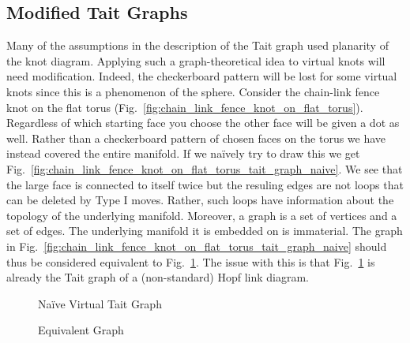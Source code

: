     \subsection{Modified Tait Graphs}
        Many of the assumptions in the description of the Tait graph used
        planarity of the knot diagram. Applying such a graph-theoretical
        idea to virtual knots will need modification. Indeed, the checkerboard
        pattern will be lost for some virtual knots since this is a
        phenomenon of the sphere. Consider the chain-link fence knot on the
        flat torus (Fig.~\ref{fig:chain_link_fence_knot_on_flat_torus}).
        Regardless of which starting face you choose the other face will be
        given a dot as well. Rather than a checkerboard pattern of chosen
        faces on the torus we have instead covered the entire manifold. If we
        na\"{i}vely try to draw this we get
        Fig.~\ref{fig:chain_link_fence_knot_on_flat_torus_tait_graph_naive}. We
        see that the large face is connected to itself twice but the
        resuling edges are not loops that can be deleted by Type I moves.
        Rather, such loops  have information about the topology of the
        underlying manifold. Moreover, a graph is a set of vertices and a set
        of edges. The underlying manifold it is embedded on is immaterial.
        The graph in
        Fig.~\ref{fig:chain_link_fence_knot_on_flat_torus_tait_graph_naive}
        should thus be considered equivalent to
        Fig.~\ref{fig:chain_link_fence_knot_naive_tait_graph}. The issue with
        this is that
        Fig.~\ref{fig:chain_link_fence_knot_naive_tait_graph} is already the
        Tait graph of a (non-standard) Hopf link diagram.
        \begin{figure}
            \centering
            \begin{minipage}[b]{0.49\textwidth}
                \centering
                \caption{Na\"{i}ve Virtual Tait Graph}
                \label{fig:chain_link_fence_knot_on_flat_torus_tait_graph_naive}
            \end{minipage}
            \hfill
            \begin{minipage}[b]{0.49\textwidth}
                \centering
                \vspace{3em}
                \caption{Equivalent Graph}
                \label{fig:chain_link_fence_knot_naive_tait_graph}
            \end{minipage}
        \end{figure}

